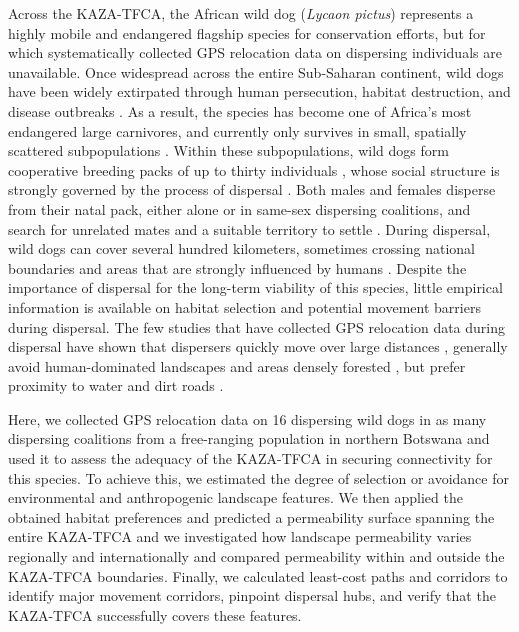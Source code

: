 \documentclass[abstract=on,10pt,a4paper,bibliography=totocnumbered]{article}
\begin{document}
Across the KAZA-TFCA, the African wild dog (\textit{Lycaon pictus}) represents a
highly mobile and endangered flagship species for conservation efforts, but for
which systematically collected GPS relocation data on dispersing individuals are
unavailable. Once widespread across the entire Sub-Saharan continent, wild dogs
have been widely extirpated through human persecution, habitat destruction, and
disease outbreaks \citep{Woodroffe.2012}. As a result, the species has become
one of Africa's most endangered large carnivores, and currently only survives in
small, spatially scattered subpopulations \citep{Woodroffe.2012}. Within these
subpopulations, wild dogs form cooperative breeding packs of up to thirty
individuals \citep{Frame.1979, Fuller.1992, Creel.2002}, whose social structure
is strongly governed by the process of dispersal \citep{McNutt.1996,
Woodroffe.2019, Behr.2020}. Both males and females disperse from their natal
pack, either alone or in same-sex dispersing coalitions, and search for
unrelated mates and a suitable territory to settle \citep{McNutt.1996,
Cozzi.2020, Behr.2020}. During dispersal, wild dogs can cover several hundred
kilometers, sometimes crossing national boundaries and areas that are strongly
influenced by humans \citep{DaviesMostert.2012, Masenga.2016, Woodroffe.2019,
Cozzi.2020}. Despite the importance of dispersal for the long-term viability of
this species, little empirical information is available on habitat selection and
potential movement barriers during dispersal. The few studies that have
collected GPS relocation data during dispersal have shown that dispersers
quickly move over large distances \citep{Woodroffe.2019}, generally avoid
human-dominated landscapes \citep{Masenga.2016, Oneill.2020, Cozzi.2020} and
areas densely forested \citep{Oneill.2020}, but prefer proximity to water and
dirt roads \citep{Oneill.2020}.

Here, we collected GPS relocation data on 16 dispersing wild dogs in as many
dispersing coalitions from a free-ranging population in northern Botswana and
used it to assess the adequacy of the KAZA-TFCA in securing connectivity for
this species. To achieve this, we estimated the degree of selection or avoidance
for environmental and anthropogenic landscape features. We then applied the
obtained habitat preferences and predicted a permeability surface spanning the
entire KAZA-TFCA and we investigated how landscape permeability varies
regionally and internationally and compared permeability within and outside the
KAZA-TFCA boundaries. Finally, we calculated least-cost paths and corridors to
identify major movement corridors, pinpoint dispersal hubs, and verify that the
KAZA-TFCA successfully covers these features.
\end{document}
